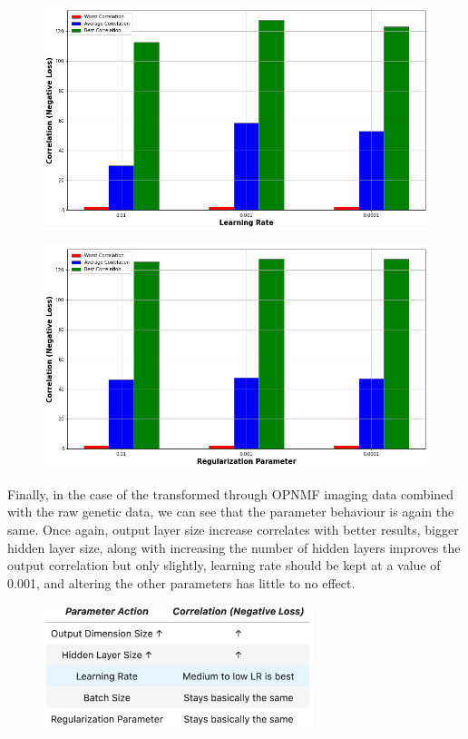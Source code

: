 {\begin{figure}[H]
    \caption{}
\end{figure}
\begin{figure}[H]
    \centering
    \includegraphics[width=\textwidth]{figures/DCCA_optimizations/NMF_Learning.png}
    \caption{}
\end{figure}
\begin{figure}[H]
    \centering
    \includegraphics[width=\textwidth]{figures/DCCA_optimizations/NMF_Regularization.png}
    \caption{}
\end{figure}

Finally, in the case of the transformed through OPNMF imaging data combined with the raw genetic data, we can see that the parameter behaviour is again the same. Once again, output layer size increase correlates with better results, bigger hidden layer size, along with increasing the number of hidden layers improves the output correlation but only slightly, learning rate should be kept at a value of 0.001, and altering the other parameters has little to no effect.  

\begin{figure}[H]
    \centering
    \includegraphics[width=0.7\textwidth]{figures/DCCA_optimizations/NMF_Conclusions.png}
    \caption{}
\end{figure}
}